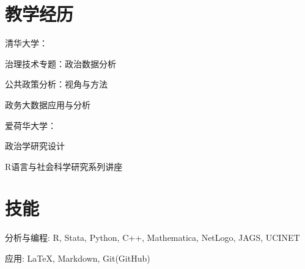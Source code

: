 \documentclass[10.5pt,]{article}
\providecommand{\tightlist}{%
	\setlength{\itemsep}{0pt}\setlength{\parskip}{0pt}}
\renewenvironment{itemize}{
	\begin{list}{}{
			\setlength{\leftmargin}{1.5em}
		}
	}{
	\end{list}
}
\begin{document}
\hypertarget{ux6559ux5b66ux7ecfux5386}{%
\section{教学经历}\label{ux6559ux5b66ux7ecfux5386}}

\begin{itemize}
\tightlist
\item
  清华大学：

  \begin{itemize}
  \tightlist
  \item
    治理技术专题：政治数据分析
  \item
    公共政策分析：视角与方法
  \item
    政务大数据应用与分析
  \end{itemize}
\item
  爱荷华大学：

  \begin{itemize}
  \tightlist
  \item
    政治学研究设计
  \item
    R语言与社会科学研究系列讲座
  \end{itemize}
\end{itemize}

\hypertarget{ux6280ux80fd}{%
\section{技能}\label{ux6280ux80fd}}

\begin{itemize}
\tightlist
\item
  分析与编程: R, Stata, Python, C++, Mathematica, NetLogo, JAGS, UCINET
\item
  应用: \LaTeX, Markdown, Git(GitHub)
\end{itemize}
	
			
\end{document}
